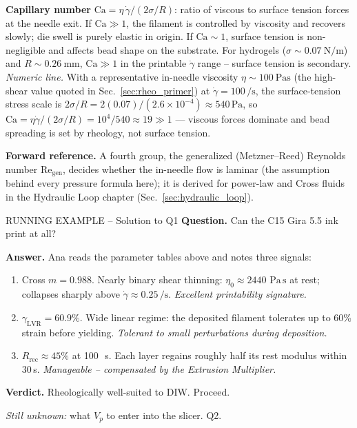 \documentclass[11pt,a4paper]{article}
\newcommand{\gd}{\dot{\gamma}}
\newcommand{\Pas}{\,\mathrm{Pa\,s}}
\newcommand{\Rey}{\mathrm{Re}}
\newcommand{\Ca}{\mathrm{Ca}}
\begin{document}
\begin{dimensionlessbox}
\textbf{Capillary number} $\Ca = \eta\,\gd / (2\sigma/R)$: ratio of
viscous to surface tension forces at the needle exit. If $\Ca\gg 1$,
the filament is controlled by viscosity and recovers slowly; die swell
is purely elastic in origin. If $\Ca\sim 1$, surface tension is
non-negligible and affects bead shape on the substrate.
For hydrogels ($\sigma\sim\SI{0.07}{\N\per\m}$) and
$R\sim\SI{0.26}{\mm}$, $\Ca\gg 1$ in the printable $\gd$ range --
surface tension is secondary.
\emph{Numeric line.} With a representative in-needle viscosity
$\eta\sim \SI{100}{\Pa\s}$ (the high-shear value quoted in
Sec.~\ref{sec:rheo_primer}) at $\gd=100\,\si{\per\s}$, the surface-tension
stress scale is $2\sigma/R = 2(0.07)/(2.6\times10^{-4})\approx
540\,\si{\Pa}$, so $\Ca=\eta\gd/(2\sigma/R)=10^4/540\approx 19\gg 1$ ---
viscous forces dominate and bead spreading is set by rheology, not surface
tension.

\medskip\noindent\textbf{Forward reference.} A fourth group, the
generalized (Metzner--Reed) Reynolds number $\Rey_\mathrm{gen}$, decides
whether the in-needle flow is laminar (the assumption behind every
pressure formula here); it is derived for power-law and Cross fluids in the
Hydraulic Loop chapter (Sec.~\ref{sec:hydraulic_loop}).
\end{dimensionlessbox}

\begin{runningbox}{RUNNING EXAMPLE -- Solution to Q1}
\textbf{Question.} Can the C15 Gira 5.5 ink print at all?

\medskip\textbf{Answer.} Ana reads the parameter tables above and notes
three signals:
\begin{enumerate}[leftmargin=1.6em,itemsep=2pt]
\item Cross $m=0.988$. Nearly binary shear thinning: $\eta_0\approx
  2440\,\Pas$ at rest; collapses sharply above $\gd\approx
  0.25\,\si{\per\s}$. \emph{Excellent printability signature.}
\item $\gamma_\mathrm{LVR}=60.9\%$. Wide linear regime: the deposited
  filament tolerates up to 60\% strain before yielding. \emph{Tolerant
  to small perturbations during deposition.}
\item $R_\mathrm{rec}\approx 45\%$ at 100\,\si{\per\s}. Each layer
  regains roughly half its rest modulus within 30\,\si{\s}.
  \emph{Manageable -- compensated by the Extrusion Multiplier.}
\end{enumerate}
\textbf{Verdict.} Rheologically well-suited to DIW. Proceed.

\medskip\emph{Still unknown:} what $V_p$ to enter into the slicer. Q2.
\end{runningbox}
\end{document}
